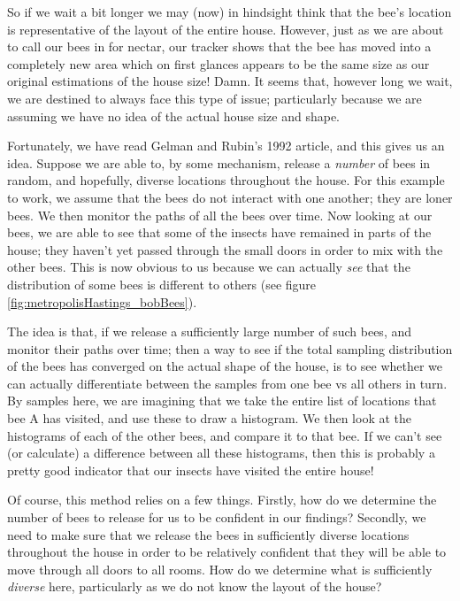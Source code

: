 \documentclass[11pt,fullpage]{book}
\begin{document}
So if we wait a bit longer we may (now) in hindsight think that the bee's location is representative of the layout of the entire house. However, just as we are about to call our bees in for nectar, our tracker shows that the bee has moved into a completely new area which on first glances appears to be the same size as our original estimations of the house size! Damn. It seems that, however long we wait, we are destined to always face this type of issue; particularly because we are assuming we have no idea of the actual house size and shape.

Fortunately, we have read Gelman and Rubin's 1992 article, and this gives us an idea. Suppose we are able to, by some mechanism, release a \textit{number} of bees in random, and hopefully, diverse locations throughout the house. For this example to work, we assume that the bees do not interact with one another; they are loner bees. We then monitor the paths of all the bees over time. Now looking at our bees, we are able to see that some of the insects have remained in parts of the house; they haven't yet passed through the small doors in order to mix with the other bees. This is now obvious to us because we can actually \textit{see} that the distribution of some bees is different to others (see figure \ref{fig:metropolisHastings_bobBees}).

The idea is that, if we release a sufficiently large number of such bees, and monitor their paths over time; then a way to see if the total sampling distribution of the bees has converged on the actual shape of the house, is to see whether we can actually differentiate between the samples from one bee vs all others in turn. By samples here, we are imagining that we take the entire list of locations that bee A has visited, and use these to draw a histogram. We then look at the histograms of each of the other bees, and compare it to that bee. If we can't see (or calculate) a difference between all these histograms, then this is probably a pretty good indicator that our insects have visited the entire house!

Of course, this method relies on a few things. Firstly, how do we determine the number of bees to release for us to be confident in our findings? Secondly, we need to make sure that we release the bees in sufficiently diverse locations throughout the house in order to be relatively confident that they will be able to move through all doors to all rooms. How do we determine what is sufficiently \textit{diverse} here, particularly as we do not know the layout of the house?
\end{document}
